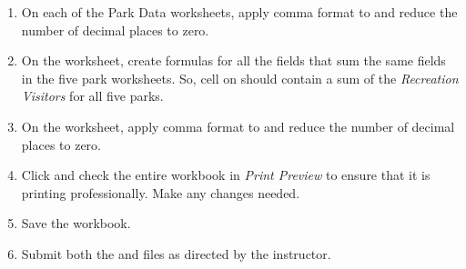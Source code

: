 \begin{enumerate}[resume]
	\item On each of the Park Data worksheets, apply comma format to  and reduce the number of decimal places to zero.
	\item On the  worksheet, create formulas for all the fields that sum the same fields in the five park worksheets. So, cell  on  should contain a sum of the \textit{Recreation Visitors} for all five parks.
	\item On the  worksheet, apply comma format to  and reduce the number of decimal places to zero.
	\item Click  and check the entire workbook in \textit{Print Preview} to ensure that it is printing professionally. Make any changes needed.
	\item Save the  workbook.
	\item Submit both the  and  files as directed by the instructor.
\end{enumerate}
